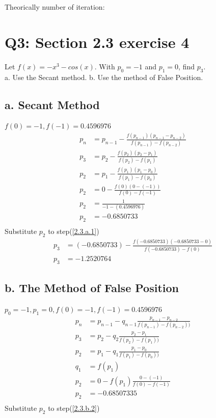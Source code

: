 \documentclass{article}
\begin{document}
Theorically number of iteration:

\section{Q3: Section 2.3 exercise 4}
Let $f(x)=-x^3-cos(x)$. With $p_0 =-1$ and $p_1 = 0$, find $p_3$.\\
a. Use the Secant method. b. Use the method of False Position.
\subsection{a. Secant Method}
$f(0)=-1, f(-1)=0.4596976$
\begin{align}
\label{secant_theorem}p_n & = p_{n-1}-\frac{f(p_{n-1})(p_{n-1}-p_{n-2})}{f(p_{n-1})-f(p_{n-2})}\\
\label{2.3.a.1}p_3 & = p_2 - \frac{f(p_2)(p_2-p_1)}{f(p_2)-f(p_1)}\\
\label{2.3.a.2}p_2 & = p_1 - \frac{f(p_1)(p_1-p_0)}{f(p_1)-f(p_0)}\\
\label{2.3.a.3}p_2 & = 0 - \frac{f(0)(0-(-1))}{f(0)-f(-1)}\\
\label{2.3.a.4}p_2 & = \frac{1}{-1-(0.4596976)}\\
\label{2.3.a.5}p_2 & = -0.6850733\\
\end{align}
Substitute $p_2$ to step(\ref{2.3.a.1})
\begin{align}
\label{2.3.a.6}p_3 & = (-0.6850733) - \frac{f(-0.6850733)(-0.6850733-0)}{f(-0.6850733)-f(0)}\\
\label{2.3.a.7}p_3 & = -1.2520764
\end{align}

\subsection{b. The Method of False Position}
$p_0=-1, p_1=0, f(0)=-1, f(-1)=0.4596976$
\begin{align}
\label{2.3.b.1}p_n & = p_{n-1} - q_{n-1}\frac{p_{n-1}-p_{n-2}}{f(p_{n-1})-f(p_{n-2}))}\\
\label{2.3.b.2}p_3 & = p_2 - q_2\frac{p_2-p_1}{f(p_2)-f(p_1))}\\
\label{2.3.b.3}p_2 & = p_1 - q_1\frac{p_1-p_0}{f(p_1)-f(p_0))}\\
\label{2.3.b.3.1}q_1 & = f(p_1)\\
\label{2.3.b.4}p_2 & = 0 - f(p_1)\frac{0-(-1)}{f(0)-f(-1)}\\
\label{2.3.b.5}p_2 & = -0.68507335\\
\end{align}
Substitute $p_2$ to step(\ref{2.3.b.2})
\end{document}
